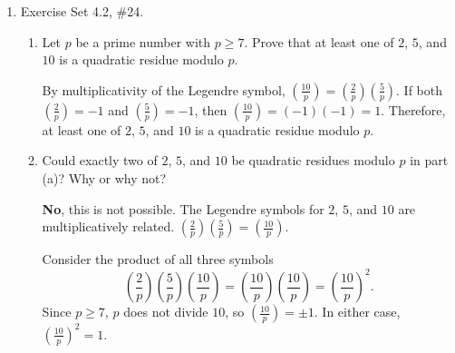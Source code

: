 \begin{enumerate}
\begin{subprove}
    By , since $p\equiv 1\pmod{4}$, it is found that $\left(\frac{-1}{p}\right)=1$.
    
    Using the properties of the Legendre symbol
    \[
      \left(\frac{a}{p}\right) = \left(\frac{-1 \cdot -a}{p}\right) = \left(\frac{-1}{p}\right)\left(\frac{-a}{p}\right) = (1) \cdot \left(\frac{p-a}{p}\right) = \left(\frac{p-a}{p}\right).
    \]
    The map $a \mapsto p-a$ is a bijection from the set $\{1, \ldots, \frac{p-1}{2}\}$ to the set $\{\frac{p+1}{2}, \ldots, p-1\}$. Since $\left(\frac{a}{p}\right) = \left(\frac{p-a}{p}\right)$ for each $a$,
    \[
      S_1 = \sum_{a=1}^{(p-1)/2}\left(\frac{a}{p}\right) = \sum_{a=1}^{(p-1)/2}\left(\frac{p-a}{p}\right) = \sum_{b=(p+1)/2}^{p-1}\left(\frac{b}{p}\right) = S_2.
    \]
    A system of two equations is established.
    \begin{enumerate}
        \item $S_1 + S_2 = 0$
        \item $S_1 = S_2$
    \end{enumerate}
    Therefore, $S_1 = 0$, and so $\sum_{a=1}^{(p-1)/2}\left(\frac{a}{p}\right)=0$.
  \end{subprove}




  \newpage
  \item Exercise Set 4.2, \#24.
  \begin{enumerate}
    \item Let $p$ be a prime number with $p \geq 7$. Prove that at least one of $2$, 
    $5$, and $10$ is a quadratic residue modulo $p$.
    \begin{subprove}
      By multiplicativity of the Legendre symbol, $\left(\frac{10}{p}\right) = \left(\frac{2}{p}\right)\left(\frac{5}{p}\right)$. If both $\left(\frac{2}{p}\right) = -1$ and $\left(\frac{5}{p}\right) = -1$, then $\left(\frac{10}{p}\right) = (-1)(-1) = 1$. Therefore, at least one of $2$, $5$, and $10$ is a quadratic residue modulo $p$.
    \end{subprove}
    \item Could exactly two of $2$, $5$, and $10$ be quadratic residues modulo $p$ 
    in part (a)? Why or why not?
    \begin{subanswer}
      \textbf{No}, this is not possible. The Legendre symbols for $2$, $5$, and $10$ are multiplicatively related. $\left(\frac{2}{p}\right)\left(\frac{5}{p}\right) = \left(\frac{10}{p}\right)$.
      
      Consider the product of all three symbols
      \[
      \left(\frac{2}{p}\right)\left(\frac{5}{p}\right)\left(\frac{10}{p}\right) = \left(\frac{10}{p}\right)\left(\frac{10}{p}\right) = \left(\frac{10}{p}\right)^2.
      \]
      Since $p \geq 7$, $p$ does not divide $10$, so $\left(\frac{10}{p}\right) = \pm 1$. In either case, $\left(\frac{10}{p}\right)^2 = 1$.
      

\end{subanswer}
\end{enumerate}
\end{enumerate}
